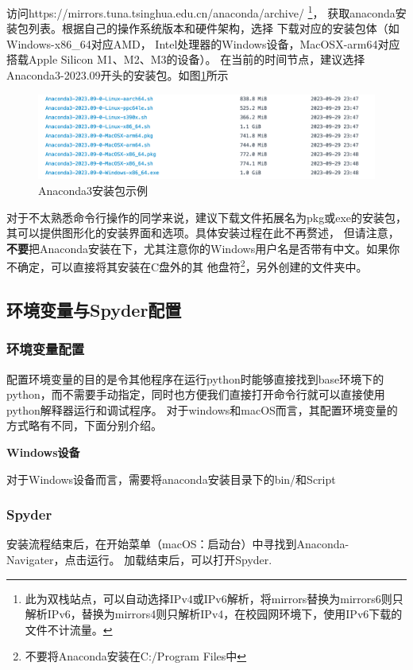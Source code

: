 访问https://mirrors.tuna.tsinghua.edu.cn/anaconda/archive/ \footnote{此为双栈站点，可以自动选择IPv4或IPv6解析，将mirrors替换为mirrors6则只解析IPv6，替换为mirrors4则只解析IPv4，在校园网环境下，使用IPv6下载的文件不计流量。}，
获取anaconda安装包列表。根据自己的操作系统版本和硬件架构，选择
下载对应的安装包体（如Windows-x86\_64对应AMD，
Intel处理器的Windows设备，MacOSX-arm64对应搭载Apple Silicon M1、M2、M3的设备）。
在当前的时间节点，建议选择Anaconda3-2023.09开头的安装包。如图\ref{fig:anacondaSelection}所示
\begin{figure}[htbp]
    \centering
    \includegraphics*[width=0.8\linewidth]{pic/tuna_anacondaDownload.png}
    \caption{Anaconda3安装包示例}
    \label{fig:anacondaSelection}
\end{figure}

对于不太熟悉命令行操作的同学来说，建议下载文件拓展名为pkg或exe的安装包，其可以提供图形化的安装界面和选项。具体安装过程在此不再赘述，
但请注意，\textbf{不要}把Anaconda安装在下，尤其注意你的Windows用户名是否带有中文。如果你不确定，可以直接将其安装在C盘外的其
他盘符\footnote{不要将Anaconda安装在C:/Program Files中}，另外创建的文件夹中。

\subsection{环境变量与Spyder配置}

\subsubsection{环境变量配置}
配置环境变量的目的是令其他程序在运行python时能够直接找到base环境下的python，而不需要手动指定，同时也方便我们直接打开命令行就可以直接使用python解释器运行和调试程序。
对于windows和macOS而言，其配置环境变量的方式略有不同，下面分别介绍。

\textbf{Windows设备}

对于Windows设备而言，需要将anaconda安装目录下的bin/和Script

\subsubsection{Spyder}
安装流程结束后，在开始菜单（macOS：启动台）中寻找到Anaconda-Navigater，点击运行。
加载结束后，可以打开Spyder.